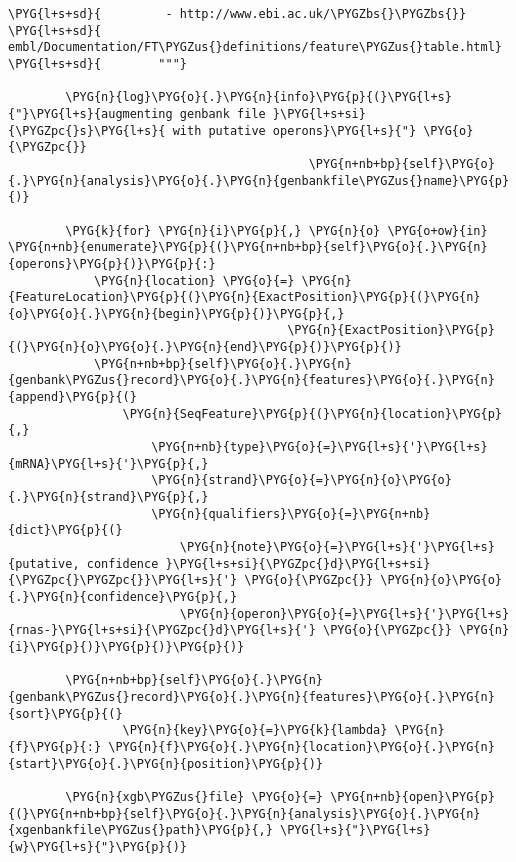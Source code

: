 \begin{Verbatim}[commandchars=\\\{\}]
\PYG{l+s+sd}{         - http://www.ebi.ac.uk/\PYGZbs{}\PYGZbs{}}
\PYG{l+s+sd}{                 embl/Documentation/FT\PYGZus{}definitions/feature\PYGZus{}table.html}
\PYG{l+s+sd}{        """}

        \PYG{n}{log}\PYG{o}{.}\PYG{n}{info}\PYG{p}{(}\PYG{l+s}{"}\PYG{l+s}{augmenting genbank file }\PYG{l+s+si}{\PYGZpc{}s}\PYG{l+s}{ with putative operons}\PYG{l+s}{"} \PYG{o}{\PYGZpc{}}
                                          \PYG{n+nb+bp}{self}\PYG{o}{.}\PYG{n}{analysis}\PYG{o}{.}\PYG{n}{genbankfile\PYGZus{}name}\PYG{p}{)}

        \PYG{k}{for} \PYG{n}{i}\PYG{p}{,} \PYG{n}{o} \PYG{o+ow}{in} \PYG{n+nb}{enumerate}\PYG{p}{(}\PYG{n+nb+bp}{self}\PYG{o}{.}\PYG{n}{operons}\PYG{p}{)}\PYG{p}{:}
            \PYG{n}{location} \PYG{o}{=} \PYG{n}{FeatureLocation}\PYG{p}{(}\PYG{n}{ExactPosition}\PYG{p}{(}\PYG{n}{o}\PYG{o}{.}\PYG{n}{begin}\PYG{p}{)}\PYG{p}{,}
                                       \PYG{n}{ExactPosition}\PYG{p}{(}\PYG{n}{o}\PYG{o}{.}\PYG{n}{end}\PYG{p}{)}\PYG{p}{)}
            \PYG{n+nb+bp}{self}\PYG{o}{.}\PYG{n}{genbank\PYGZus{}record}\PYG{o}{.}\PYG{n}{features}\PYG{o}{.}\PYG{n}{append}\PYG{p}{(}
                \PYG{n}{SeqFeature}\PYG{p}{(}\PYG{n}{location}\PYG{p}{,}
                    \PYG{n+nb}{type}\PYG{o}{=}\PYG{l+s}{'}\PYG{l+s}{mRNA}\PYG{l+s}{'}\PYG{p}{,}
                    \PYG{n}{strand}\PYG{o}{=}\PYG{n}{o}\PYG{o}{.}\PYG{n}{strand}\PYG{p}{,}
                    \PYG{n}{qualifiers}\PYG{o}{=}\PYG{n+nb}{dict}\PYG{p}{(}
                        \PYG{n}{note}\PYG{o}{=}\PYG{l+s}{'}\PYG{l+s}{putative, confidence }\PYG{l+s+si}{\PYGZpc{}d}\PYG{l+s+si}{\PYGZpc{}\PYGZpc{}}\PYG{l+s}{'} \PYG{o}{\PYGZpc{}} \PYG{n}{o}\PYG{o}{.}\PYG{n}{confidence}\PYG{p}{,}
                        \PYG{n}{operon}\PYG{o}{=}\PYG{l+s}{'}\PYG{l+s}{rnas-}\PYG{l+s+si}{\PYGZpc{}d}\PYG{l+s}{'} \PYG{o}{\PYGZpc{}} \PYG{n}{i}\PYG{p}{)}\PYG{p}{)}\PYG{p}{)}

        \PYG{n+nb+bp}{self}\PYG{o}{.}\PYG{n}{genbank\PYGZus{}record}\PYG{o}{.}\PYG{n}{features}\PYG{o}{.}\PYG{n}{sort}\PYG{p}{(}
                \PYG{n}{key}\PYG{o}{=}\PYG{k}{lambda} \PYG{n}{f}\PYG{p}{:} \PYG{n}{f}\PYG{o}{.}\PYG{n}{location}\PYG{o}{.}\PYG{n}{start}\PYG{o}{.}\PYG{n}{position}\PYG{p}{)}

        \PYG{n}{xgb\PYGZus{}file} \PYG{o}{=} \PYG{n+nb}{open}\PYG{p}{(}\PYG{n+nb+bp}{self}\PYG{o}{.}\PYG{n}{analysis}\PYG{o}{.}\PYG{n}{xgenbankfile\PYGZus{}path}\PYG{p}{,} \PYG{l+s}{"}\PYG{l+s}{w}\PYG{l+s}{"}\PYG{p}{)}


\end{Verbatim}

